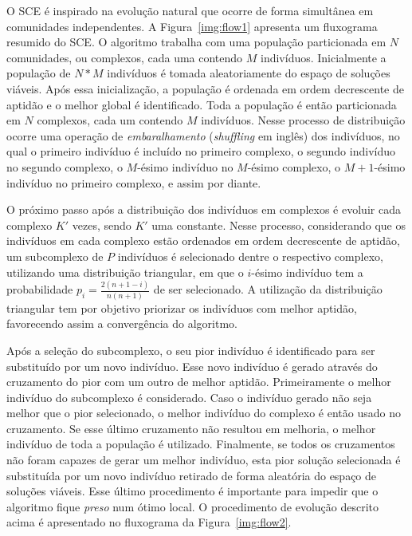 O SCE é inspirado na evolução natural que ocorre de forma simultânea em
comunidades independentes.
A Figura~\ref{img:flow1} apresenta um fluxograma resumido do SCE.
O algoritmo trabalha com uma população particionada em $N$ comunidades,
ou complexos, cada uma contendo $M$ indivíduos.
Inicialmente a população de $N*M$ indivíduos é tomada aleatoriamente do espaço
de soluções viáveis.
Após essa inicialização, a população é ordenada em ordem decrescente de aptidão
e o melhor global é identificado.
Toda a população é então particionada em $N$ complexos, cada um contendo $M$ indivíduos.
Nesse processo de distribuição ocorre uma operação de \emph{embaralhamento} (\emph{shuffling} em inglês)
dos indivíduos, no qual o primeiro indivíduo é incluído no primeiro complexo,
o segundo indivíduo no segundo complexo, o $M$-ésimo
indivíduo no $M$-ésimo complexo, o $M+1$-ésimo indivíduo no primeiro complexo,
e assim por diante.

O próximo passo após a distribuição dos indivíduos em complexos é evoluir cada
complexo $K'$ vezes, sendo $K'$ uma constante.
Nesse processo, considerando que os indivíduos em cada complexo estão ordenados
em ordem decrescente de aptidão, um subcomplexo de $P$ indivíduos é selecionado
dentre o respectivo complexo, utilizando uma distribuição triangular, em que o $i$-ésimo
indivíduo tem a probabilidade $p_i = \frac{2(n+1-i)}{n(n+1)}$ de ser selecionado.
A utilização da distribuição triangular tem por objetivo priorizar os indivíduos
com melhor aptidão, favorecendo assim a convergência do algoritmo.

Após a seleção do subcomplexo, o seu pior indivíduo é identificado para ser
substituído por um novo indivíduo.
Esse novo indivíduo é gerado através do cruzamento do pior com um outro
de melhor aptidão.
Primeiramente o melhor indivíduo do subcomplexo é considerado.
Caso o indivíduo gerado não seja melhor que o pior selecionado,
o melhor indivíduo do complexo é então usado no cruzamento.
Se esse último cruzamento não resultou em melhoria, o melhor indivíduo de toda
a população é utilizado.
Finalmente, se todos os cruzamentos não foram capazes de gerar um melhor indivíduo,
esta pior solução selecionada é substituída por um novo indivíduo retirado de
forma aleatória do espaço de soluções viáveis.
Esse último procedimento é importante para impedir que o algoritmo fique
\emph{preso} num ótimo local.
O procedimento de evolução descrito acima é apresentado no fluxograma da Figura~\ref{img:flow2}.

